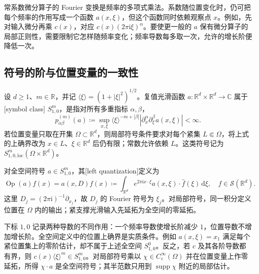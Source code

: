常系数微分算子的 Fourier 变换是频率的多项式乘法。系数随位置变化时，仍可把每个频率的作用写成一个函数 \(a(x,\xi)\)，但这个函数同时依赖观察点 \(x\)。例如，先对输入微分再乘 \(c(x)\)，对应 \(c(x)(2\pi\mathrm i\xi)^\alpha\)。要使更一般的 \(a\) 保有微分算子的局部正则性，需要限制它怎样随频率变化；频率导数每多取一次，允许的增长阶便降低一次。

\subsection{符号的阶与位置变量的一致性}
\label{b2:subsec:G0101}

\begin{definition}[符号类与左量子化]
\label{b2:def:G-symbol}
设 \(d\ge1\)、\(m\in\mathbb R\)，并记
\(\langle\xi\rangle=(1+|\xi|^2)^{1/2}\)。复值光滑函数
\(a:\mathbb R^d\times\mathbb R^d\to\mathbb C\) 属于
[symbol class] \(S^m_{1,0}\)，是指对所有多重指标 \(\alpha,\beta\)，
\[
 p_{\alpha\beta}^{(m)}(a)
 \coloneqq\sup_{x,\xi}\langle\xi\rangle^{-m+|\beta|}
       |\partial_x^\alpha\partial_\xi^\beta a(x,\xi)|<\infty.
\]
若位置变量只取在开集 \(\Omega\subset\mathbb R^d\)，则局部符号条件要求对每个紧集 \(L\Subset\Omega\)，将上式的上确界改为 \(x\in L\)、\(\xi\in\mathbb R^d\) 后仍有限；常数允许依赖 \(L\)。这类符号记为 \(S^m_{1,0,\mathrm{loc}}(\Omega\times\mathbb R^d)\)。

\ProseParagraphBreak
对全空间符号 \(a\in S^m_{1,0}\)，其[left quantization]定义为
\[
 \operatorname{Op}(a)f(x)=a(x,D)f(x)
 \coloneqq\int_{\mathbb R^d}e^{2\pi\mathrm ix\cdot\xi}
          a(x,\xi)\cdot\widehat f(\xi)\,\mathrm d\xi,
 \quad f\in\mathcal S(\mathbb R^d).
\]
这里 \(D_j=(2\pi\mathrm i)^{-1}\partial_{x_j}\)，故 \(D_j\) 的 Fourier 符号为 \(\xi_j\)。对局部符号，同一积分定义位置在 \(\Omega\) 内的输出；紧支撑光滑输入先延拓为全空间的零延拓。
\end{definition}

下标 \(1,0\) 记录两种导数的不同作用：一个频率导数使增长阶减少 \(1\)，位置导数不增加增长阶。全空间定义中的位置上确界是实质条件。例如 \(a(x,\xi)=x_1\) 满足每个紧位置集上的零阶估计，却不属于上述全空间 \(S^0_{1,0}\)。反之，若 \(c\) 及其各阶导数都有界，则 \(c(x)\langle\xi\rangle^m\in S^m_{1,0}\)。对局部符号乘以 \(\chi\in C_c^\infty(\Omega)\) 并在位置变量上作零延拓，所得 \(\chi\cdot a\) 是全空间符号；其半范数只用到 \(\operatorname{supp}\chi\) 附近的局部估计。

